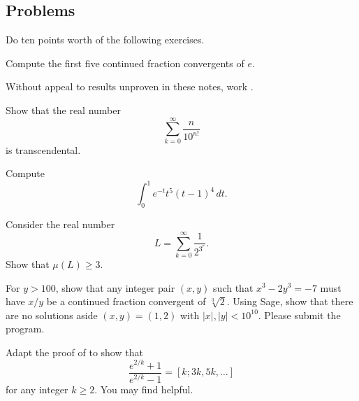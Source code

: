 \documentclass[../notes.tex]{subfiles}
\begin{document}
\subsection{Problems}
Do ten points worth of the following exercises.
\begin{prob}[1 points]
	Compute the first five continued fraction convergents of $e$.
\end{prob}
\begin{prob}[2 points]
	Without appeal to results unproven in these notes, work .
\end{prob}
\begin{prob}[3 points]
	Show that the real number
	\[\sum_{k=0}^\infty\frac n{10^{n!}}\]
	is transcendental.
\end{prob}
\begin{prob}[3 points]
	Compute
	\[\int_0^1e^{-t}t^5(t-1)^4\,dt.\]
\end{prob}
\begin{prob}[4 points]
	Consider the real number
	\[L=\sum_{k=0}^\infty\frac1{2^{3^r}}.\]
	Show that $\mu(L)\ge3$.
\end{prob}
\begin{prob}[5 points]
	For $y>100$, show that any integer pair $(x,y)$ such that $x^3-2y^3=-7$ must have $x/y$ be a continued fraction convergent of $\sqrt[3]2$. Using Sage, show that there are no solutions aside $(x,y)=(1,2)$ with $\left|x\right|,\left|y\right|<10^{10}$. Please submit the program.
\end{prob}
\begin{prob}[10 points]
	Adapt the proof of  to show that
	\[\frac{e^{2/k}+1}{e^{2/k}-1}=[k;3k,5k,\ldots]\]
	for any integer $k\ge2$. You may find \cite{olds-cf-e} helpful.
\end{prob}
\end{document}

